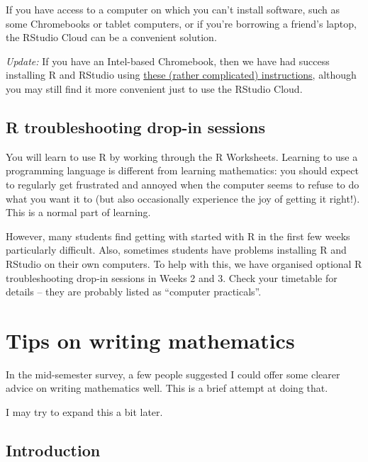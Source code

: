 \documentclass[
  a4paper,
]{book}
\theoremstyle{definition}
\theoremstyle{definition}
\theoremstyle{definition}
\theoremstyle{definition}
\theoremstyle{remark}
\begin{document}
If you have access to a computer on which you can't install software, such as some Chromebooks or tablet computers, or if you're borrowing a friend's laptop, the RStudio Cloud can be a convenient solution.

\emph{Update:} If you have an Intel-based Chromebook, then we have had success installing R and RStudio using \href{https://levente.littvay.hu/chromebook/}{these (rather complicated) instructions}, although you may still find it more convenient just to use the RStudio Cloud.

\hypertarget{troubleshooting}{%
\section*{R troubleshooting drop-in sessions}\label{troubleshooting}}

You will learn to use R by working through the R Worksheets. Learning to use a programming language is different from learning mathematics: you should expect to regularly get frustrated and annoyed when the computer seems to refuse to do what you want it to (but also occasionally experience the joy of getting it right!). This is a normal part of learning.

However, many students find getting with started with R in the first few weeks particularly difficult. Also, sometimes students have problems installing R and RStudio on their own computers. To help with this, we have organised optional R troubleshooting drop-in sessions in Weeks 2 and 3. Check your timetable for details -- they are probably listed as ``computer practicals''.

\hypertarget{writing}{%
\chapter*{Tips on writing mathematics}\label{writing}}

In the mid-semester survey, a few people suggested I could offer some clearer advice on writing mathematics well. This is a brief attempt at doing that.

I may try to expand this a bit later.

\hypertarget{writing-intro}{%
\section*{Introduction}\label{writing-intro}}
\end{document}
